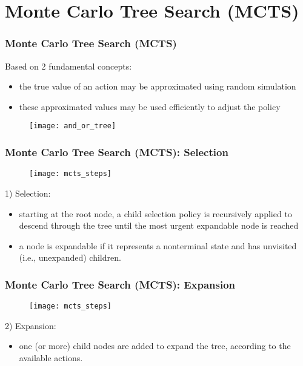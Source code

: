 \section{Monte Carlo Tree Search (MCTS)}

\begin{frame}
\frametitle{Monte Carlo Tree Search (MCTS)}
Based on 2 fundamental concepts:
\begin{itemize}
\item {\small the true value of an action may be approximated using random simulation}
\item these approximated values may be used efficiently to adjust the policy
\end{itemize}

\begin{figure}
    \centering
    \texttt{[image: and\_or\_tree]}
\end{figure}

\end{frame}

\begin{frame}
\frametitle{Monte Carlo Tree Search (MCTS): Selection}
\begin{figure}
    \centering
    \texttt{[image: mcts\_steps]}
\end{figure}

1) Selection:
\small
\begin{itemize}
\item starting at the root node, a child selection policy is recursively applied to descend through the tree until
the most urgent expandable node is reached
\item a node is expandable if it represents a nonterminal state and has unvisited (i.e., unexpanded) children.
\end{itemize}
\end{frame}

\begin{frame}
\frametitle{Monte Carlo Tree Search (MCTS): Expansion}
\begin{figure}
    \centering
    \texttt{[image: mcts\_steps]}
\end{figure}

2) Expansion:
\small
\begin{itemize}
\item one (or more) child nodes are added to expand the tree, according to the available actions.
\end{itemize}
\end{frame}

